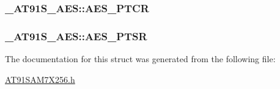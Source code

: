 \hypertarget{struct__AT91S__AES_bddd341be76eec39b59ef90e83a91cda}{
\subsubsection{ {\bf \_\-AT91S\_\-AES::AES\_\-PTCR}}}
\label{struct__AT91S__AES_bddd341be76eec39b59ef90e83a91cda}


\hypertarget{struct__AT91S__AES_f609a8f741722712a4b7cdc337a52f91}{
\subsubsection{ {\bf \_\-AT91S\_\-AES::AES\_\-PTSR}}}
\label{struct__AT91S__AES_f609a8f741722712a4b7cdc337a52f91}




The documentation for this struct was generated from the following file:\begin{CompactItemize}
\item 
\hyperlink{AT91SAM7X256_8h}{AT91SAM7X256.h}\end{CompactItemize}
